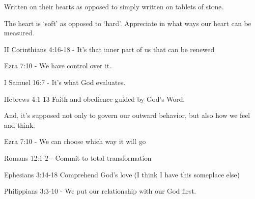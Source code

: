\begin{discussion}

Written on their hearts as opposed to simply written on tablets of stone.

The heart is `soft' as opposed to `hard'.  Appreciate in what ways our heart can be measured.


II Corinthians 4:16-18 - It's that inner part of us that can be renewed

Ezra 7:10 - We have control over it.

I Samuel 16:7 - It's what God evaluates.


Hebrews 4:1-13  Faith and obedience guided by God's Word.

And, it's supposed not only to govern our outward behavior, but also how we feel and think.


Ezra 7:10 - We can choose which way it will go

Romans 12:1-2 - Commit to total transformation

Ephesians 3:14-18 Comprehend God's love (I think I have this someplace else)

Philippians 3:3-10 - We put our relationship with our God first.

\end{discussion}